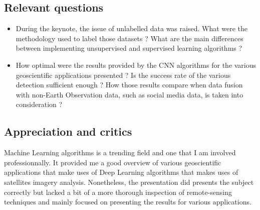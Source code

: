 \documentclass[11pt,a4paper]{article}
\begin{document}
\subsection{Relevant questions}

\begin{itemize}
  \item During the keynote, the issue of unlabelled data was raised. What were the methodology used to label those datasets ? What are the main differences between implementing unsupervised and supervised learning algorithms ?
  \item How optimal were the results provided by the CNN algorithms for the various geoscientific applications presented ? Is the success rate of the various detection sufficient enough ? How those results compare when data fusion with non-Earth Observation data, such as social media data, is taken into consideration ?
\end{itemize}

\subsection{Appreciation and critics}

Machine Learning algorithms is a trending field and one that I am involved professionnally. It provided me a good overview of various geoscientific applications that make uses of Deep Learning algorithms that makes uses of satellites imagery analysis. Nonetheless, the presentation did presents the subject correctly but lacked a bit of a more thorough inspection of remote-sensing techniques and mainly focused on presenting the results for various applications.



\end{document}
